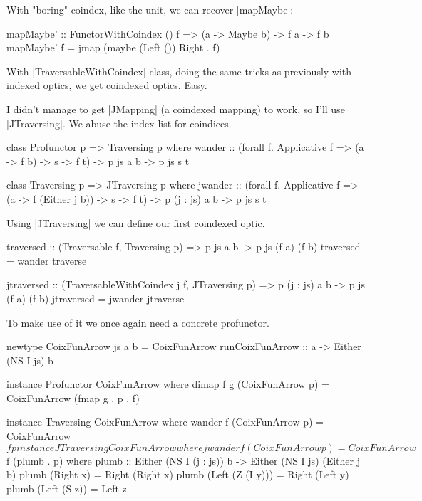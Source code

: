 With "boring" coindex, like the unit, we can recover |mapMaybe|:

\begin{code}
mapMaybe' :: FunctorWithCoindex () f => (a -> Maybe b) -> f a -> f b
mapMaybe' f = jmap (maybe (Left ()) Right . f)
\end{code}

With |TraversableWithCoindex| class, doing the same tricks as previously
with indexed optics, we get coindexed optics. Easy.

I didn't manage to get |JMapping| (a coindexed mapping) to work,
so I'll use |JTraversing|.
We abuse the index list for coindices.

\begin{code}
class Profunctor p => Traversing p where
    wander :: (forall f. Applicative f => (a -> f b) -> s -> f t)
           -> p js a b -> p js s t

class Traversing p => JTraversing p where
    jwander
        :: (forall f. Applicative f => (a -> f (Either j b)) -> s -> f t)
        -> p (j : js) a b -> p js s t
\end{code}

Using |JTraversing| we can define our first coindexed optic.

\begin{code}
traversed :: (Traversable f, Traversing p) => p js a b -> p js (f a) (f b)
traversed = wander traverse

jtraversed :: (TraversableWithCoindex j f, JTraversing p)
           => p (j : js) a b -> p js (f a) (f b)
jtraversed = jwander jtraverse
\end{code}

To make use of it we once again need a concrete profunctor.

\begin{code}
newtype CoixFunArrow js a b = CoixFunArrow
    { runCoixFunArrow :: a -> Either (NS I js) b }

instance Profunctor CoixFunArrow where
    dimap f g (CoixFunArrow p) = CoixFunArrow (fmap g . p . f)

instance Traversing CoixFunArrow where
    wander f (CoixFunArrow p) = CoixFunArrow $ f p

instance JTraversing CoixFunArrow where
    jwander f (CoixFunArrow p) = CoixFunArrow $ f (plumb . p) where
        plumb :: Either (NS I (j : js)) b -> Either (NS I js) (Either j b)
        plumb (Right x)        = Right (Right x)
        plumb (Left (Z (I y))) = Right (Left y)
        plumb (Left (S z))     = Left z
\end{code}


